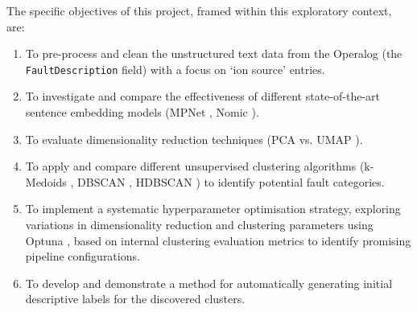 \documentclass[10pt,oneside]{report}
\begin{document}
The specific objectives of this project, framed within this exploratory context, are:
\begin{enumerate}
    \item To pre-process and clean the unstructured text data from the Operalog (the \\ \texttt{FaultDescription} field) with a focus on `ion source' entries.
    \item To investigate and compare the effectiveness of different state-of-the-art sentence embedding models (MPNet \cite{song2020mpnet}, Nomic \cite{nussbaum2024nomic}).
    \item To evaluate dimensionality reduction techniques (PCA \cite{pearson1901liii} vs. UMAP \cite{mcinnes2018umap}).
    \item To apply and compare different unsupervised clustering algorithms (k-Medoids \cite{kmedoids}, DBSCAN \cite{ester1996density}, HDBSCAN \cite{campello2013density}) to identify potential fault categories.
    \item To implement a systematic hyperparameter optimisation strategy, exploring variations in dimensionality reduction and clustering parameters using Optuna \cite{akiba2019optuna}, based on internal clustering evaluation metrics \cite{rousseeuw1987silhouettes, davies1979cluster, calinski1974dendrite} to identify promising pipeline configurations.
    \item To develop and demonstrate a method for automatically generating initial descriptive labels for the discovered clusters.
\end{enumerate}

\end{document}

